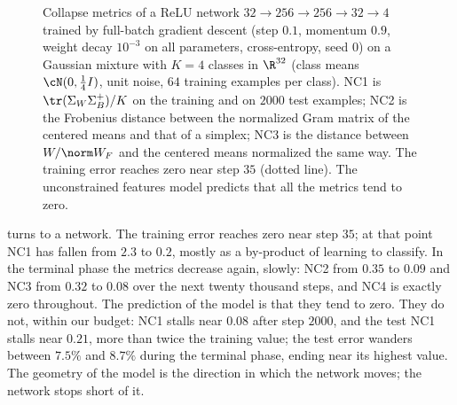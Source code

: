 \begin{refsection}
\begin{figure}[t]
\centering
{}
\caption{Collapse metrics of a ReLU network $32\to256\to256\to32\to4$ trained by full-batch gradient descent (step $0.1$, momentum $0.9$, weight decay $10^{-3}$ on all parameters, cross-entropy, seed $0$) on a Gaussian mixture with $K=4$ classes in $\R^{32}$ (class means $\cN(0,\frac14I)$, unit noise, $64$ training examples per class). NC1 is $\tr(\Sigma_W\Sigma_B^+)/K$ on the training and on $2000$ test examples; NC2 is the Frobenius distance between the normalized Gram matrix of the centered means and that of a simplex; NC3 is the distance between $W/\norm W_F$ and the centered means normalized the same way. The training error reaches zero near step $35$ (dotted line). The unconstrained features model predicts that all the metrics tend to zero.}\label{fig:collapse:network}
\end{figure}

 turns to a network. The training error reaches zero near step $35$; at that point NC1 has fallen from $2.3$ to $0.2$, mostly as a by-product of learning to classify. In the terminal phase the metrics decrease again, slowly: NC2 from $0.35$ to $0.09$ and NC3 from $0.32$ to $0.08$ over the next twenty thousand steps, and NC4 is exactly zero throughout. The prediction of the model is that they tend to zero. They do not, within our budget: NC1 stalls near $0.08$ after step $2000$, and the test NC1 stalls near $0.21$, more than twice the training value; the test error wanders between $7.5\%$ and $8.7\%$ during the terminal phase, ending near its highest value. The geometry of the model is the direction in which the network moves; the network stops short of it.


\end{refsection}
